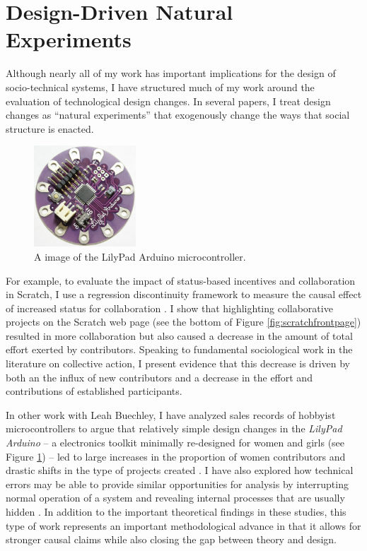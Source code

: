 \documentclass[10pt]{memoir}
\begin{document}
\section{Design-Driven Natural Experiments}

Although nearly all of my work has important implications for the
design of socio-technical systems, I have structured much of my work
around the evaluation of technological design changes. In several
papers, I treat design changes as ``natural experiments'' that
exogenously change the ways that social structure is enacted.

\begin{figure}
 \vspace{-1em}
 \begin{centering}
 \includegraphics[width=1.5in]{figures/lilypad.png}
 \caption{A image of the LilyPad Arduino microcontroller.}
 \label{fig:lilypad}
 \end{centering}
 \vspace{-1em}
\end{figure}

For example, to evaluate the impact of status-based incentives and
collaboration in Scratch, I use a regression discontinuity framework
to measure the causal effect of increased status for collaboration
\cite{hill_causal_2012}. I show that highlighting collaborative
projects on the Scratch web page (see the bottom of Figure
\ref{fig:scratchfrontpage}) resulted in more collaboration but also
caused a decrease in the amount of total effort exerted by
contributors. Speaking to fundamental sociological work in the
literature on collective action, I present evidence that this decrease
is driven by both an the influx of new contributors and a decrease in
the effort and contributions of established participants.

In other work with Leah Buechley, I have analyzed sales records of
hobbyist microcontrollers to argue that relatively simple design
changes in the \emph{LilyPad Arduino} -- a electronics toolkit
minimally re-designed for women and girls (see Figure
\ref{fig:lilypad}) -- led to large increases in the proportion of
women contributors and drastic shifts in the type of projects created
\cite{buechley_lilypad_2010}. I have also explored how technical
errors may be able to provide similar opportunities for analysis by
interrupting normal operation of a system and revealing internal
processes that are usually hidden \cite{hill_revealing_2010}. In
addition to the important theoretical findings in these studies, this
type of work represents an important methodological advance in that it
allows for stronger causal claims while also closing the gap between
theory and design.
\end{document}
